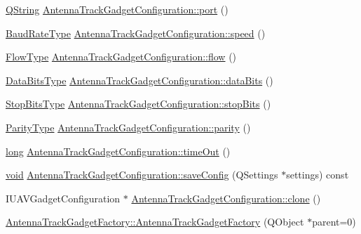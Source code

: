 \begin{DoxyCompactItemize}
\item 
\hyperlink{group___u_a_v_objects_plugin_gab9d252f49c333c94a72f97ce3105a32d}{Q\-String} \hyperlink{group___antenna_track_gadget_plugin_ga191565f9ae925e1b1b00f3b51254d102}{Antenna\-Track\-Gadget\-Configuration\-::port} ()
\item 
\hyperlink{qextserialport_8h_a6f031169a6a9b150b5af707bb23cf010}{Baud\-Rate\-Type} \hyperlink{group___antenna_track_gadget_plugin_ga9f04acbb3e66e621c35afaa756e61cb0}{Antenna\-Track\-Gadget\-Configuration\-::speed} ()
\item 
\hyperlink{qextserialport_8h_a02ad1c7cf791a069dd54e409f8db4790}{Flow\-Type} \hyperlink{group___antenna_track_gadget_plugin_ga6c02451beb6f94db4d3c67bd13fa9c3e}{Antenna\-Track\-Gadget\-Configuration\-::flow} ()
\item 
\hyperlink{qextserialport_8h_a189ef78c2c1b7537ab114d576f6214fa}{Data\-Bits\-Type} \hyperlink{group___antenna_track_gadget_plugin_gac5cb692c8bb0b91960b4697df1d68401}{Antenna\-Track\-Gadget\-Configuration\-::data\-Bits} ()
\item 
\hyperlink{qextserialport_8h_adc8078895cd941d755d46633b54d3e7f}{Stop\-Bits\-Type} \hyperlink{group___antenna_track_gadget_plugin_ga9cb31ed1936c27264a65a79f45ca67b9}{Antenna\-Track\-Gadget\-Configuration\-::stop\-Bits} ()
\item 
\hyperlink{qextserialport_8h_aee22d32d87c815090354bf9b8e957ace}{Parity\-Type} \hyperlink{group___antenna_track_gadget_plugin_ga24493de658f97012f89d15d6058bc1f7}{Antenna\-Track\-Gadget\-Configuration\-::parity} ()
\item 
\hyperlink{ioapi_8h_a3c7b35ad9dab18b8310343c201f7b27e}{long} \hyperlink{group___antenna_track_gadget_plugin_gaeecdda26c0e04883d4ddb31cca80a3ca}{Antenna\-Track\-Gadget\-Configuration\-::time\-Out} ()
\item 
\hyperlink{group___u_a_v_objects_plugin_ga444cf2ff3f0ecbe028adce838d373f5c}{void} \hyperlink{group___antenna_track_gadget_plugin_ga5666ade504f914b0118bb6cc51919d95}{Antenna\-Track\-Gadget\-Configuration\-::save\-Config} (Q\-Settings $\ast$settings) const 
\item 
I\-U\-A\-V\-Gadget\-Configuration $\ast$ \hyperlink{group___antenna_track_gadget_plugin_ga75fc3a4d561ce3996236b59c1cde51f3}{Antenna\-Track\-Gadget\-Configuration\-::clone} ()
\item 
\hyperlink{group___antenna_track_gadget_plugin_ga1ef8f35faf1ffe91c15080461b78649c}{Antenna\-Track\-Gadget\-Factory\-::\-Antenna\-Track\-Gadget\-Factory} (Q\-Object $\ast$parent=0)
\item 

\end{DoxyCompactItemize}
